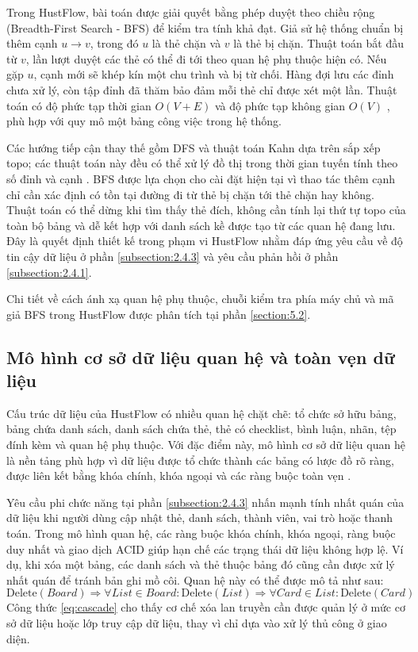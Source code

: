 \documentclass[../DoAn.tex]{subfiles}
\begin{document}
Trong HustFlow, bài toán được giải quyết bằng phép duyệt theo chiều rộng (Breadth-First Search - BFS) để kiểm tra tính khả đạt. Giả sử hệ thống chuẩn bị thêm cạnh $u \rightarrow v$, trong đó $u$ là thẻ chặn và $v$ là thẻ bị chặn. Thuật toán bắt đầu từ $v$, lần lượt duyệt các thẻ có thể đi tới theo quan hệ phụ thuộc hiện có. Nếu gặp $u$, cạnh mới sẽ khép kín một chu trình và bị từ chối. Hàng đợi lưu các đỉnh chưa xử lý, còn tập đỉnh đã thăm bảo đảm mỗi thẻ chỉ được xét một lần. Thuật toán có độ phức tạp thời gian $O(V + E)$ và độ phức tạp không gian $O(V)$ \cite{cormen2009algorithms}, phù hợp với quy mô một bảng công việc trong hệ thống.

Các hướng tiếp cận thay thế gồm DFS và thuật toán Kahn dựa trên sắp xếp topo; các thuật toán này đều có thể xử lý đồ thị trong thời gian tuyến tính theo số đỉnh và cạnh \cite{cormen2009algorithms}. BFS được lựa chọn cho cài đặt hiện tại vì thao tác thêm cạnh chỉ cần xác định có tồn tại đường đi từ thẻ bị chặn tới thẻ chặn hay không. Thuật toán có thể dừng khi tìm thấy thẻ đích, không cần tính lại thứ tự topo của toàn bộ bảng và dễ kết hợp với danh sách kề được tạo từ các quan hệ đang lưu. Đây là quyết định thiết kế trong phạm vi HustFlow nhằm đáp ứng yêu cầu về độ tin cậy dữ liệu ở phần \ref{subsection:2.4.3} và yêu cầu phản hồi ở phần \ref{subsection:2.4.1}.

Chi tiết về cách ánh xạ quan hệ phụ thuộc, chuỗi kiểm tra phía máy chủ và mã giả BFS trong HustFlow được phân tích tại phần \ref{section:5.2}.

\subsection{Mô hình cơ sở dữ liệu quan hệ và toàn vẹn dữ liệu}
\label{subsection:3.1.2}

Cấu trúc dữ liệu của HustFlow có nhiều quan hệ chặt chẽ: tổ chức sở hữu bảng, bảng chứa danh sách, danh sách chứa thẻ, thẻ có checklist, bình luận, nhãn, tệp đính kèm và quan hệ phụ thuộc. Với đặc điểm này, mô hình cơ sở dữ liệu quan hệ là nền tảng phù hợp vì dữ liệu được tổ chức thành các bảng có lược đồ rõ ràng, được liên kết bằng khóa chính, khóa ngoại và các ràng buộc toàn vẹn \cite{codd1970relational}.

Yêu cầu phi chức năng tại phần \ref{subsection:2.4.3} nhấn mạnh tính nhất quán của dữ liệu khi người dùng cập nhật thẻ, danh sách, thành viên, vai trò hoặc thanh toán. Trong mô hình quan hệ, các ràng buộc khóa chính, khóa ngoại, ràng buộc duy nhất và giao dịch ACID giúp hạn chế các trạng thái dữ liệu không hợp lệ. Ví dụ, khi xóa một bảng, các danh sách và thẻ thuộc bảng đó cũng cần được xử lý nhất quán để tránh bản ghi mồ côi. Quan hệ này có thể được mô tả như sau:
\begin{equation}\label{eq:cascade}
    \text{Delete}(Board) \Longrightarrow \forall List \in Board: \text{Delete}(List) \Longrightarrow \forall Card \in List: \text{Delete}(Card)
\end{equation}
Công thức \eqref{eq:cascade} cho thấy cơ chế xóa lan truyền cần được quản lý ở mức cơ sở dữ liệu hoặc lớp truy cập dữ liệu, thay vì chỉ dựa vào xử lý thủ công ở giao diện.
\end{document}
